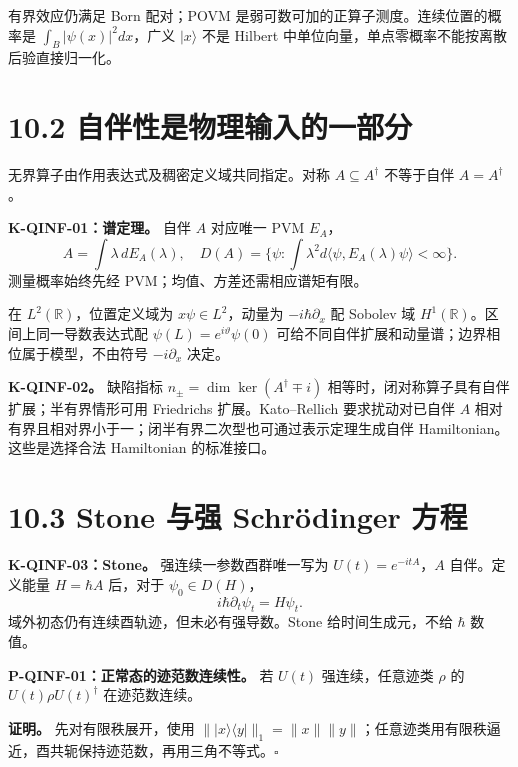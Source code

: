 \documentclass[
  11pt,
  oneside]{book}
\begin{document}
有界效应仍满足 Born 配对；POVM
是弱可数可加的正算子测度。连续位置的概率是 \(\int_B|\psi(x)|^2dx\)，广义
\(|x\rangle\) 不是 Hilbert
中单位向量，单点零概率不能按离散后验直接归一化。

\hypertarget{ux81eaux4f34ux6027ux662fux7269ux7406ux8f93ux5165ux7684ux4e00ux90e8ux5206}{%
\section{10.2
自伴性是物理输入的一部分}\label{ux81eaux4f34ux6027ux662fux7269ux7406ux8f93ux5165ux7684ux4e00ux90e8ux5206}}

无界算子由作用表达式及稠密定义域共同指定。对称 \(A\subseteq A^\dagger\)
不等于自伴 \(A=A^\dagger\)。

\textbf{K-QINF-01：谱定理。} 自伴 \(A\) 对应唯一 PVM \(E_A\)， \[
A=\int\lambda\,dE_A(\lambda),\quad
D(A)=\{\psi:\int\lambda^2d\langle\psi,E_A(\lambda)\psi\rangle<\infty\}.
\] 测量概率始终先经 PVM；均值、方差还需相应谱矩有限。

在 \(L^2(\mathbb R)\)，位置定义域为 \(x\psi\in L^2\)，动量为
\(-i\hbar\partial_x\) 配 Sobolev 域
\(H^1(\mathbb R)\)。区间上同一导数表达式配
\(\psi(L)=e^{i\vartheta}\psi(0)\)
可给不同自伴扩展和动量谱；边界相位属于模型，不由符号 \(-i\partial_x\)
决定。

\textbf{K-QINF-02。} 缺陷指标 \(n_\pm=\dim\ker(A^\dagger\mp i)\)
相等时，闭对称算子具有自伴扩展；半有界情形可用 Friedrichs
扩展。Kato--Rellich 要求扰动对已自伴 \(A\)
相对有界且相对界小于一；闭半有界二次型也可通过表示定理生成自伴
Hamiltonian。这些是选择合法 Hamiltonian 的标准接口。

\hypertarget{stone-ux4e0eux5f3a-schruxf6dinger-ux65b9ux7a0b}{%
\section{10.3 Stone 与强 Schrödinger
方程}\label{stone-ux4e0eux5f3a-schruxf6dinger-ux65b9ux7a0b}}

\textbf{K-QINF-03：Stone。} 强连续一参数酉群唯一写为
\(U(t)=e^{-itA}\)，\(A\) 自伴。定义能量 \(H=\hbar A\) 后，对于
\(\psi_0\in D(H)\)， \[
i\hbar\partial_t\psi_t=H\psi_t.
\] 域外初态仍有连续酉轨迹，但未必有强导数。Stone 给时间生成元，不给
\(\hbar\) 数值。

\protect\hypertarget{p-qinf-01}{}{}

\textbf{P-QINF-01：正常态的迹范数连续性。} 若 \(U(t)\) 强连续，任意迹类
\(\rho\) 的 \(U(t)\rho U(t)^\dagger\) 在迹范数连续。

\textbf{证明。} 先对有限秩展开，使用
\(\||x\rangle\langle y|\|_1=\|x\|\|y\|\)；任意迹类用有限秩逼近，酉共轭保持迹范数，再用三角不等式。\(\square\)
\end{document}
